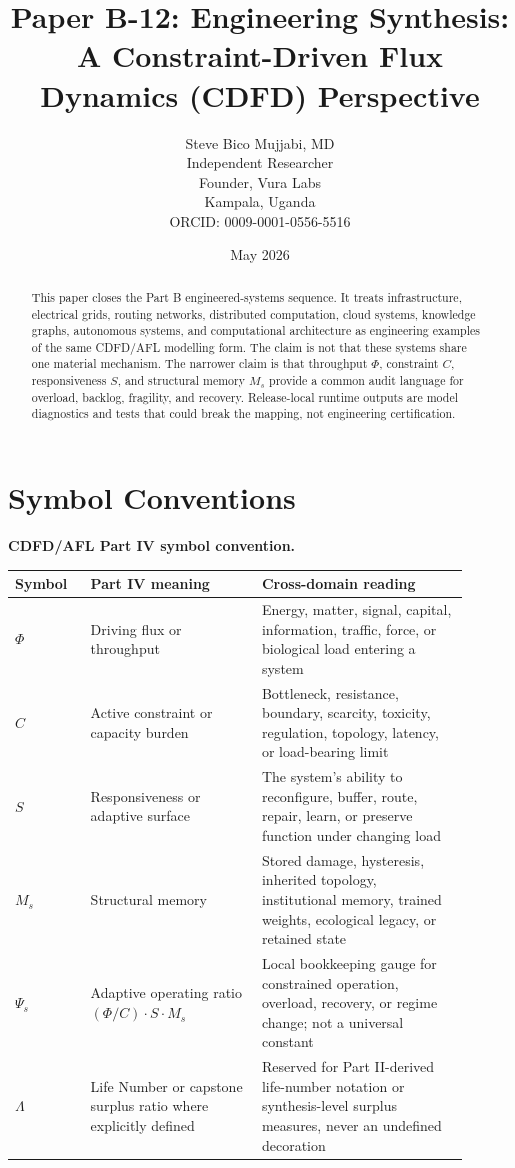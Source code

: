 \documentclass[12pt,a4paper]{article}
\title{\textbf{Paper B-12: Engineering Synthesis:\\ A Constraint-Driven Flux Dynamics (CDFD) Perspective}}
\author{Steve Bico Mujjabi, MD\\
\small Independent Researcher\\
\small Founder, Vura Labs\\
\small Kampala, Uganda\\
\small ORCID: 0009-0001-0556-5516}
\date{May 2026}
\begin{document}
\maketitle

\begin{abstract}
This paper closes the Part B engineered-systems sequence. It treats
infrastructure, electrical grids, routing networks, distributed computation,
cloud systems, knowledge graphs, autonomous systems, and computational
architecture as engineering examples of the same CDFD/AFL modelling form. The
claim is not that these systems share one material mechanism. The narrower
claim is that throughput $\Phi$, constraint $C$, responsiveness $S$, and
structural memory $M_s$ provide a common audit language for overload, backlog,
fragility, and recovery. Release-local runtime outputs are model diagnostics and
tests that could break the mapping, not engineering certification.
\end{abstract}

\section*{Symbol Conventions}

\noindent\textbf{CDFD/AFL Part IV symbol convention.}
\begin{center}
{\small
\begin{tabular}{p{0.15\linewidth}p{0.34\linewidth}p{0.41\linewidth}}
\hline
Symbol & Part IV meaning & Cross-domain reading \\
\hline
$\Phi$ & Driving flux or throughput & Energy, matter, signal, capital, information, traffic, force, or biological load entering a system \\
$C$ & Active constraint or capacity burden & Bottleneck, resistance, boundary, scarcity, toxicity, regulation, topology, latency, or load-bearing limit \\
$S$ & Responsiveness or adaptive surface & The system's ability to reconfigure, buffer, route, repair, learn, or preserve function under changing load \\
$M_s$ & Structural memory & Stored damage, hysteresis, inherited topology, institutional memory, trained weights, ecological legacy, or retained state \\
$\Psi_s$ & Adaptive operating ratio $(\Phi/C)\cdot S\cdot M_s$ & Local bookkeeping gauge for constrained operation, overload, recovery, or regime change; not a universal constant \\
$\Lambda$ & Life Number or capstone surplus ratio where explicitly defined & Reserved for Part II-derived life-number notation or synthesis-level surplus measures, never an undefined decoration \\
\hline
\end{tabular}
}
\end{center}
\end{document}

